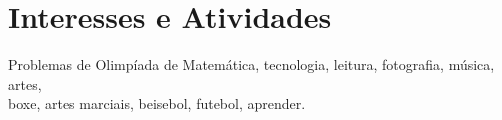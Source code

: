 \documentclass[a4paper,10pt]{article} %
\begin{document}

\section{Interesses e Atividades}

Problemas de Olimpíada de Matemática, tecnologia, leitura, fotografia, música, artes,\\
boxe, artes marciais, beisebol, futebol, aprender.

\end{document}
